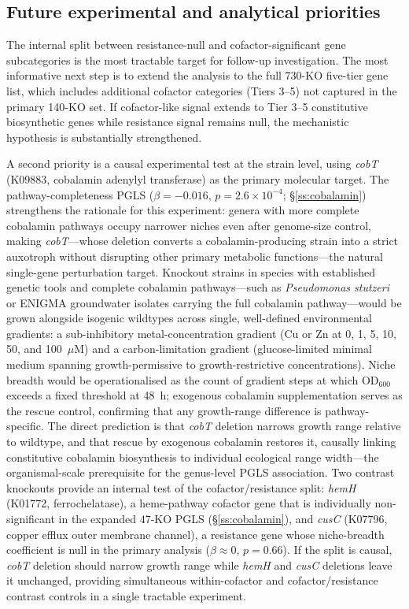 \documentclass[times]{zHenriquesLab-StyleBioRxiv}
\begin{document}


\subsection*{Future experimental and analytical priorities}

The internal split between resistance-null and cofactor-significant gene
subcategories is the most tractable target for follow-up investigation. The most
informative next step is to extend the analysis to the full 730-KO five-tier
gene list, which includes additional cofactor categories (Tiers 3--5) not
captured in the primary 140-KO set. If cofactor-like signal extends to Tier 3--5
constitutive biosynthetic genes while resistance signal remains null, the
mechanistic hypothesis is substantially strengthened.

A second priority is a causal experimental test at the strain level, using
\textit{cobT} (K09883, cobalamin adenylyl transferase) as the primary molecular
target. The pathway-completeness PGLS ($\beta = -0.016$,
$p = 2.6 \times 10^{-4}$; \S\ref{ss:cobalamin}) strengthens the rationale for
this experiment: genera with more complete cobalamin pathways occupy narrower
niches even after genome-size control, making \textit{cobT}---whose deletion
converts a cobalamin-producing strain into a strict auxotroph without disrupting
other primary metabolic functions---the natural single-gene perturbation target. Knockout strains
in species with established genetic tools and complete cobalamin pathways---such
as \textit{Pseudomonas stutzeri} or ENIGMA groundwater isolates carrying the full
cobalamin pathway---would be grown alongside isogenic wildtypes across single,
well-defined environmental gradients: a sub-inhibitory metal-concentration
gradient (Cu or Zn at 0, 1, 5, 10, 50, and 100~$\mu$M) and a carbon-limitation
gradient (glucose-limited minimal medium spanning growth-permissive to
growth-restrictive concentrations). Niche breadth would be operationalised as the
count of gradient steps at which OD$_{600}$ exceeds a fixed threshold at 48~h;
exogenous cobalamin supplementation serves as the rescue control, confirming that
any growth-range difference is pathway-specific. The direct prediction is that
\textit{cobT} deletion narrows growth range relative to wildtype, and that rescue
by exogenous cobalamin restores it, causally linking constitutive cobalamin
biosynthesis to individual ecological range width---the organismal-scale
prerequisite for the genus-level PGLS association. Two contrast knockouts provide
an internal test of the cofactor/resistance split: \textit{hemH} (K01772,
ferrochelatase), a heme-pathway cofactor gene that is individually non-significant
in the expanded 47-KO PGLS (\S\ref{ss:cobalamin}), and \textit{cusC} (K07796,
copper efflux outer membrane channel), a resistance gene whose niche-breadth
coefficient is null in the primary analysis ($\beta \approx 0$, $p = 0.66$).
If the split is causal, \textit{cobT} deletion should narrow growth range while
\textit{hemH} and \textit{cusC} deletions leave it unchanged, providing
simultaneous within-cofactor and cofactor/resistance contrast controls in a
single tractable experiment.
\end{document}
